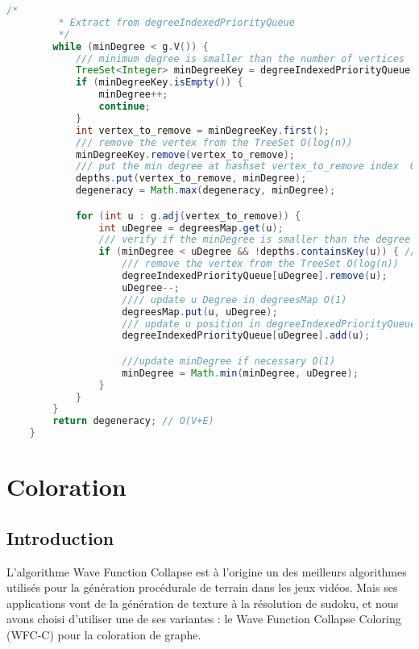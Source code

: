 \begin{lstlisting}[language=java]
        /*
         * Extract from degreeIndexedPriorityQueue
         */
        while (minDegree < g.V()) {
            /// minimum degree is smaller than the number of vertices
            TreeSet<Integer> minDegreeKey = degreeIndexedPriorityQueue[minDegree];
            if (minDegreeKey.isEmpty()) {
                minDegree++;
                continue;
            }
            int vertex_to_remove = minDegreeKey.first();
            /// remove the vertex from the TreeSet O(log(n))
            minDegreeKey.remove(vertex_to_remove);
            /// put the min degree at hashset vertex_to_remove index  O(1)
            depths.put(vertex_to_remove, minDegree);
            degeneracy = Math.max(degeneracy, minDegree);

            for (int u : g.adj(vertex_to_remove)) {
                int uDegree = degreesMap.get(u);
                /// verify if the minDegree is smaller than the degree of u O(1) and if u is not already in the TreeSet O(log(n))
                if (minDegree < uDegree && !depths.containsKey(u)) { // O(1)
                    /// remove the vertex from the TreeSet O(log(n))
                    degreeIndexedPriorityQueue[uDegree].remove(u);
                    uDegree--;
                    //// update u Degree in degreesMap O(1)
                    degreesMap.put(u, uDegree);
                    /// update u position in degreeIndexedPriorityQueue O(log(n))
                    degreeIndexedPriorityQueue[uDegree].add(u);

                    ///update minDegree if necessary O(1)
                    minDegree = Math.min(minDegree, uDegree);
                }
            }
        }
        return degeneracy; // O(V+E)
    }
\end{lstlisting}

\newpage

\section{Coloration}
\subsection{Introduction}

L'algorithme Wave Function Collapse est à l'origine un des meilleurs algorithmes utilisés pour la génération procédurale de terrain dans les jeux vidéos. Mais ses applications vont de la génération de texture à la résolution de sudoku, et nous avons choisi d'utiliser une de ses variantes : le Wave Function Collapse Coloring (WFC-C) pour la coloration de graphe.

